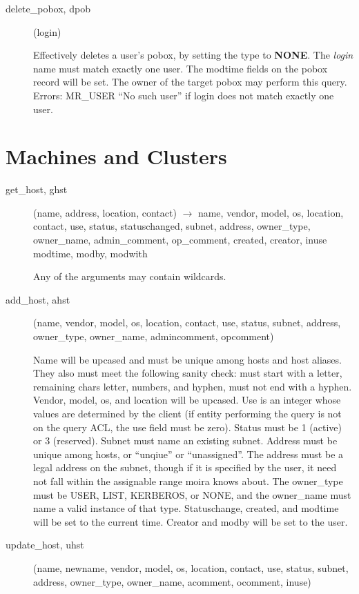 \documentclass{article}
\begin{document}
\begin{description}
\item[delete\_pobox, dpob](login)

Effectively deletes a user's pobox, by setting the type to {\bf NONE}.
The {\em login} name must match exactly one user.  The modtime fields on
the pobox record will be set.  The owner of the target pobox may
perform this query.  Errors: MR\_USER ``No such user'' if login does not
match exactly one user.

\end{description}

\section{Machines and Clusters}

\begin{description}
\item[get\_host, ghst](name, address, location, contact) $\rightarrow$ name,
vendor, model, os, location, contact, use, status, statuschanged,
subnet, address, owner\_type, owner\_name, admin\_comment, op\_comment,
created, creator, inuse modtime, modby, modwith

Any of the arguments may contain wildcards.

\item[add\_host, ahst](name, vendor, model, os, location, contact, use,
status, subnet, address, owner\_type, owner\_name, admincomment,
opcomment)

Name will be upcased and must be unique among hosts and host aliases.
They also must meet the following sanity check: must start with a
letter, remaining chars letter, numbers, and hyphen, must not end with
a hyphen.  Vendor, model, os, and location will be upcased.  Use is an
integer whose values are determined by the client (if entity
performing the query is not on the query ACL, the use field must be
zero).  Status must be 1 (active) or 3 (reserved).  Subnet must name
an existing subnet.  Address must be unique among hosts, or ``unqiue''
or ``unassigned''.  The address must be a legal address on the subnet,
though if it is specified by the user, it need not fall within the
assignable range moira knows about.  The owner\_type must be USER,
LIST, KERBEROS, or NONE, and the owner\_name must name a valid instance
of that type.  Statuschange, created, and modtime will be set to the
current time.  Creator and modby will be set to the user.

\item[update\_host, uhst](name, newname, vendor, model, os, location,
contact, use, status, subnet, address, owner\_type, owner\_name,
acomment, ocomment, inuse)


\end{description}
\end{document}
